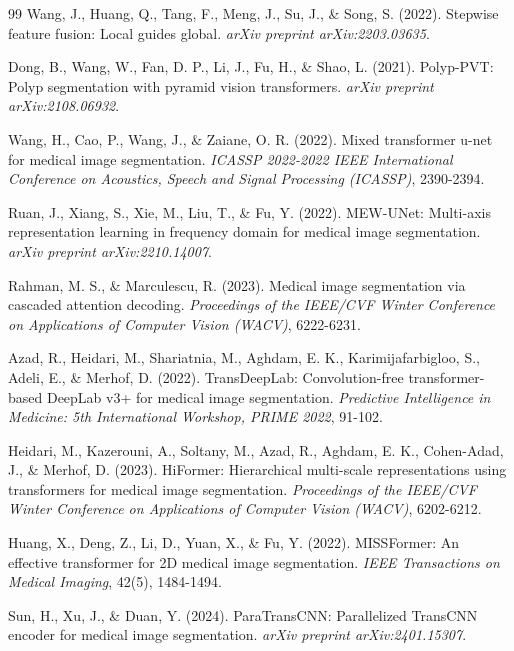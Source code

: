 \documentclass[10pt, a4paper, twocolumn]{article}
\begin{document}
\begin{thebibliography}{99}
Wang, J., Huang, Q., Tang, F., Meng, J., Su, J., \& Song, S. (2022). Stepwise feature fusion: Local guides global. \textit{arXiv preprint arXiv:2203.03635}.

Dong, B., Wang, W., Fan, D. P., Li, J., Fu, H., \& Shao, L. (2021). Polyp-PVT: Polyp segmentation with pyramid vision transformers. \textit{arXiv preprint arXiv:2108.06932}.

Wang, H., Cao, P., Wang, J., \& Zaiane, O. R. (2022). Mixed transformer u-net for medical image segmentation. \textit{ICASSP 2022-2022 IEEE International Conference on Acoustics, Speech and Signal Processing (ICASSP)}, 2390-2394.

Ruan, J., Xiang, S., Xie, M., Liu, T., \& Fu, Y. (2022). MEW-UNet: Multi-axis representation learning in frequency domain for medical image segmentation. \textit{arXiv preprint arXiv:2210.14007}.

Rahman, M. S., \& Marculescu, R. (2023). Medical image segmentation via cascaded attention decoding. \textit{Proceedings of the IEEE/CVF Winter Conference on Applications of Computer Vision (WACV)}, 6222-6231.

Azad, R., Heidari, M., Shariatnia, M., Aghdam, E. K., Karimijafarbigloo, S., Adeli, E., \& Merhof, D. (2022). TransDeepLab: Convolution-free transformer-based DeepLab v3+ for medical image segmentation. \textit{Predictive Intelligence in Medicine: 5th International Workshop, PRIME 2022}, 91-102.

Heidari, M., Kazerouni, A., Soltany, M., Azad, R., Aghdam, E. K., Cohen-Adad, J., \& Merhof, D. (2023). HiFormer: Hierarchical multi-scale representations using transformers for medical image segmentation. \textit{Proceedings of the IEEE/CVF Winter Conference on Applications of Computer Vision (WACV)}, 6202-6212.

Huang, X., Deng, Z., Li, D., Yuan, X., \& Fu, Y. (2022). MISSFormer: An effective transformer for 2D medical image segmentation. \textit{IEEE Transactions on Medical Imaging}, 42(5), 1484-1494.

Sun, H., Xu, J., \& Duan, Y. (2024). ParaTransCNN: Parallelized TransCNN encoder for medical image segmentation. \textit{arXiv preprint arXiv:2401.15307}.




\end{thebibliography}
\end{document}
